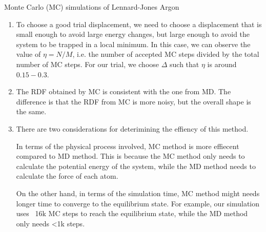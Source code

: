 \documentclass{article}
\begin{document}
\begin{section}{Monte Carlo (MC) simulations of Lennard-Jones Argon}
\begin{tcolorbox}[breakable]
			\newpage
			\begin{enumerate}
				\item To choose a good trial displacement, we need to choose a displacement that is small enough to avoid large energy changes, but large enough to avoid the system to be trapped in a local minimum. In this case, we can observe the value of $\eta = N/M$, i.e. the number of accepted MC steps divided by the total number of MC steps. For our trial, we choose $\Delta$ such that $\eta$ is around $0.15-0.3$.
				
				\item The RDF obtained by MC is consistent with the one from MD. The difference is that the RDF from MC is more noisy, but the overall shape is the same. 
				
				\item There are two considerations for deterimining the effiency of this method. 
				
				In terms of the physical process involved, MC method is more effiecent compared to MD method. This is because the MC method only needs to calculate the potential energy of the system, while the MD method needs to calculate the force of each atom. 
				
				On the other hand, in terms of the simulation time, MC method might needs longer time to converge to the equilibrium state. For example, our simulation uses ~16k MC steps to reach the equilibrium state, while the MD method only needs <1k steps. 
			\end{enumerate}
			\end{tcolorbox}
	\end{section}
\end{document}
